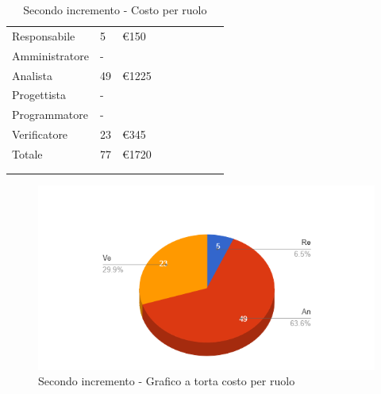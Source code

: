 {{\begin{longtable}{C{.4\freewidth} C{.2\freewidth} C{.2\freewidth} C{.2\freewidth} C{.2\freewidth} C{.2\freewidth} C{.2\freewidth} C{.2\freewidth} C{.2\freewidth}}
        Responsabile  & 5 & €150\\        
        Amministratore  & -&  \\        
        Analista &49 & €1225\\        
        Progettista &- &\\        
        Programmatore &- & \\        
        Verificatore &23 &€345\\        
        Totale&77&€1720\\
        \bottomrule
      	\\
        \caption{Secondo incremento - Costo per ruolo}

        \end{longtable}
        \begin{figure}[H]
          \includegraphics[width=15cm]{sezioni/Images/secondoT.png}
          \centering
          \caption{Secondo incremento - Grafico a torta costo per ruolo}
       \end{figure}
    }
    }

